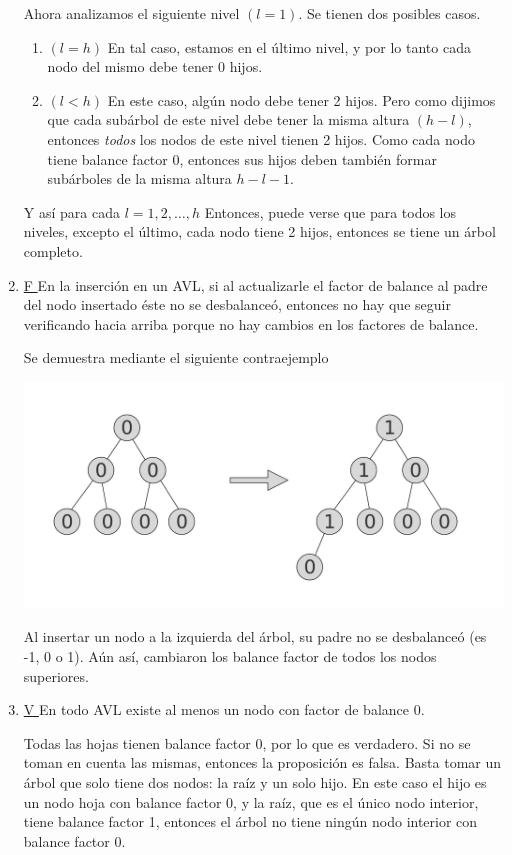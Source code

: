 \documentclass{article}
\begin{document}
\begin{enumerate}[label=\alph*)]
Ahora analizamos el siguiente nivel $(l=1)$. Se tienen dos posibles casos.
\begin{enumerate}[label=\roman{*})]
    \item $(l=h)$ En tal caso, estamos en el último nivel, y por lo tanto cada nodo del mismo debe tener 0 hijos.
    \item $(l<h)$ En este caso, algún nodo debe tener 2 hijos. Pero como dijimos que cada subárbol de este nivel debe tener la misma altura $(h-l)$, entonces \textit{todos} los nodos de este nivel tienen 2 hijos. Como cada nodo tiene balance factor 0, entonces sus hijos deben también formar subárboles de la misma altura $h-l-1$.
\end{enumerate}

Y así para cada $l = 1, 2, \dots, h$ Entonces, puede verse que para todos los niveles, excepto el último, cada nodo tiene 2 hijos, entonces se tiene un árbol completo.


\item \underline{ F } En la inserción en un AVL, si al actualizarle el factor de balance al padre del nodo insertado éste no se desbalanceó, entonces no hay que seguir verificando hacia arriba porque no hay cambios en los factores de balance.

Se demuestra mediante el siguiente contraejemplo

\begin{center}
    \includegraphics[scale=0.4]{./img/ej6c.pdf}
\end{center}

Al insertar un nodo a la izquierda del árbol, su padre no se desbalanceó (es -1, 0 o 1). Aún así, cambiaron los balance factor de todos los nodos superiores.


\item \underline{ V } En todo AVL existe al menos un nodo con factor de balance 0.

Todas las hojas tienen balance factor 0, por lo que es verdadero. Si no se toman en cuenta las mismas, entonces la proposición es falsa. Basta tomar un árbol que solo tiene dos nodos: la raíz y un solo hijo. En este caso el hijo es un nodo hoja con balance factor 0, y la raíz, que es el único nodo interior, tiene balance factor 1, entonces el árbol no tiene ningún nodo interior con balance factor 0.

\end{enumerate}
\end{document}
